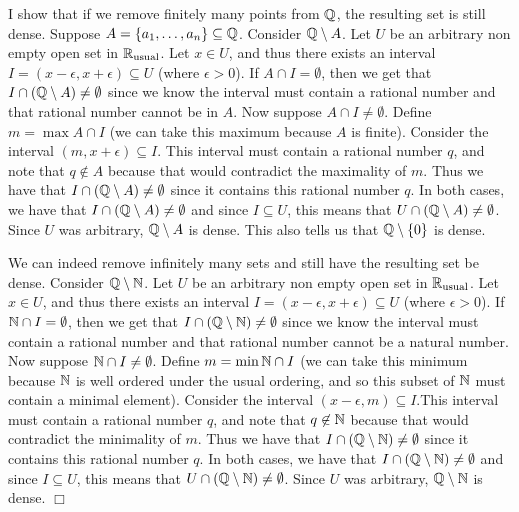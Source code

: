 \documentclass{article}
\begin{document}
 {
    I show that if we remove finitely many points from $\mathbb{Q}$, the resulting set is still dense. Suppose $A = \{a_{1},\dots, a_{n}\}\subseteq \mathbb{Q}$. Consider $\mathbb{Q}\setminus A$. Let $U$ be an arbitrary non empty open set in $\mathbb{R}_{\text{usual}}$. Let $x\in U$, and thus there exists an interval $I = (x-\epsilon, x+\epsilon)\subseteq U$ (where $\epsilon > 0$). If $A\cap I =\emptyset$, then we get that $I\cap (\mathbb{Q}\setminus A)\neq \emptyset$ since we know the interval must contain a rational number and that rational number cannot be in $A$. Now suppose $A\cap I \neq \emptyset$. Define $m = \max A\cap I$ (we can take this maximum because $A$ is finite). Consider the interval $(m, x + \epsilon)\subseteq I$. This interval must contain a rational number $q$, and note that $q\not \in A$ because that would contradict the maximality of $m$. Thus we have that $I\cap (\mathbb{Q}\setminus A)\neq \emptyset$ since it contains this rational number $q$. In both cases, we have that $I\cap (\mathbb{Q}\setminus A)\neq \emptyset$ and since $I\subseteq U$, this means that $U\cap (\mathbb{Q}\setminus A)\neq \emptyset$. Since $U$ was arbitrary, $\mathbb{Q}\setminus A$ is dense. This also tells us that  $\mathbb{Q} \setminus \{0\}$ is dense.

    We can indeed remove infinitely many sets and still have the resulting set be dense. Consider $\mathbb{Q}\setminus \mathbb{N}$. Let $U$ be an arbitrary non empty open set in $\mathbb{R}_{\text{usual}}$. Let $x\in U$, and thus there exists an interval $I = (x-\epsilon, x+\epsilon)\subseteq U$ (where $\epsilon > 0$). If $\mathbb{N}\cap I =\emptyset$, then we get that $I\cap (\mathbb{Q}\setminus \mathbb{N})\neq \emptyset$ since we know the interval must contain a rational number and that rational number cannot be a natural number. Now suppose $\mathbb{N}\cap I \neq \emptyset$. Define $m = \min \mathbb{N}\cap I$ (we can take this minimum because $\mathbb{N}$ is well ordered under the usual ordering, and so this subset of $\mathbb{N}$ must contain a minimal element). Consider the interval $(x-\epsilon, m)\subseteq I$.This interval must contain a rational number $q$, and note that $q\not \in \mathbb{N}$ because that would contradict the minimality of $m$. Thus we have that $I\cap (\mathbb{Q}\setminus \mathbb{N})\neq \emptyset$ since it contains this rational number $q$. In both cases, we have that $I\cap (\mathbb{Q}\setminus \mathbb{N})\neq \emptyset$ and since $I\subseteq U$, this means that $U\cap (\mathbb{Q}\setminus \mathbb{N})\neq \emptyset$. Since $U$ was arbitrary, $\mathbb{Q}\setminus \mathbb{N}$ is dense. $\Box$
}
\end{document}
